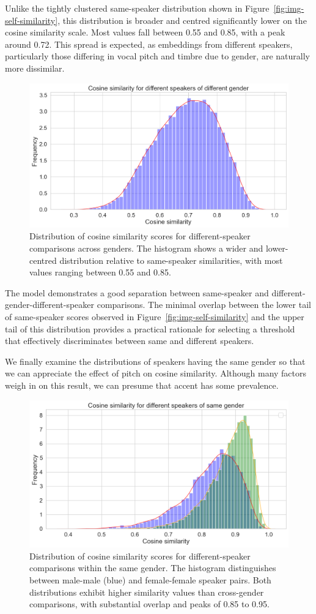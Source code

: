 \documentclass[conference]{IEEEtran}
\begin{document}
	Unlike the tightly clustered same-speaker distribution shown in Figure~\ref{fig:img-self-similarity}, this distribution is broader and centred significantly lower on the cosine similarity scale. Most values fall between 0.55 and 0.85, with a peak around 0.72. This spread is expected, as embeddings from different speakers, particularly those differing in vocal pitch and timbre due to gender, are naturally more dissimilar.
	
	\begin{figure}[H]
		\centering
		\includegraphics[width=0.7\linewidth]{img/img-similarity}
		\caption{Distribution of cosine similarity scores for different-speaker comparisons across genders. The histogram shows a wider and lower-centred distribution relative to same-speaker similarities, with most values ranging between 0.55 and 0.85.}
		\label{fig:img-similarity}
	\end{figure}
	
	The model demonstrates a good separation between same-speaker and different-gender-different-speaker comparisons. The minimal overlap between the lower tail of same-speaker scores observed in Figure~\ref{fig:img-self-similarity} and the upper tail of this distribution provides a practical rationale for selecting a threshold that effectively discriminates between same and different speakers.
	
	We finally examine the distributions of speakers having the same gender so that we can appreciate the effect of pitch on cosine similarity. Although many factors weigh in on this result, we can presume that accent has some prevalence.
	
	\begin{figure}[H]
		\centering
		\includegraphics[width=0.7\linewidth]{img/img-similarity-same-gender}
		\caption{Distribution of cosine similarity scores for different-speaker comparisons within the same gender. The histogram distinguishes between male-male (blue) and female-female speaker pairs. Both distributions exhibit higher similarity values than cross-gender comparisons, with substantial overlap and peaks of 0.85 to 0.95.}	
		\label{fig:img-similarity-same-gender}
	\end{figure}
	
\end{document}
